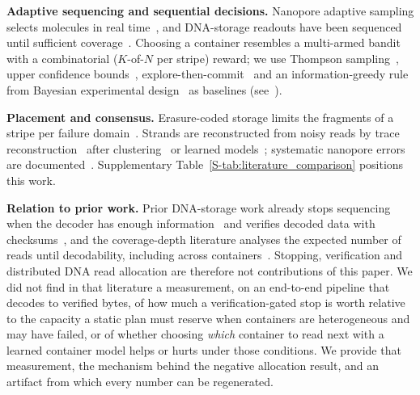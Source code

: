 \documentclass[conference,onecolumn,11pt]{IEEEtran}
\begin{document}
\textbf{Adaptive sequencing and sequential decisions.}  Nanopore adaptive sampling selects
molecules in real time~\cite{loose2016real,payne2021readfish,weilguny2023dynamic}, and
DNA-storage readouts have been sequenced until sufficient coverage~\cite{lopez2019dna}.
Choosing a container resembles a multi-armed bandit with a combinatorial ($K$-of-$N$ per stripe)
reward; we use Thompson sampling~\cite{thompson1933likelihood,russo2018tutorial}, upper
confidence bounds~\cite{auer2002finite}, explore-then-commit~\cite{garivier2016explore} and an
information-greedy rule from Bayesian experimental design~\cite{chaloner1995bayesian} as
baselines (see~\cite{lattimore2020bandit}).

\textbf{Placement and consensus.}  Erasure-coded storage limits the fragments of a stripe per
failure domain~\cite{weil2006crush,cidon2013copysets,ford2010availability,nath2006subtleties,leong2012distributed}.
Strands are reconstructed from noisy reads by trace
reconstruction~\cite{batu2004reconstructing,srinivasavaradhan2021trellis,sabary2024reconstruction}
after clustering~\cite{rashtchian2017clustering} or learned models~\cite{barlev2025deep};
systematic nanopore errors are documented~\cite{delahaye2021sequencing,wick2019performance}.
Supplementary Table~\ref{S-tab:literature_comparison} positions this work.

\textbf{Relation to prior work.}  Prior DNA-storage work already stops sequencing when the decoder has
enough information~\cite{lopez2019dna} and verifies decoded data with
checksums~\cite{erlich2017fountain}, and the coverage-depth literature analyses the expected number of
reads until decodability, including across
containers~\cite{barlev2025cover,kong2026coverage,levy2026expected}.  Stopping, verification and
distributed DNA read allocation are therefore not contributions of this paper.  We did not find in that
literature a measurement, on an end-to-end pipeline that decodes to verified bytes, of how much a
verification-gated stop is worth relative to the capacity a static plan must reserve when containers
are heterogeneous and may have failed, or of whether choosing \emph{which} container to read next with a
learned container model helps or hurts under those conditions.  We provide that measurement, the
mechanism behind the negative allocation result, and an artifact from which every number can be
regenerated.

\end{document}
